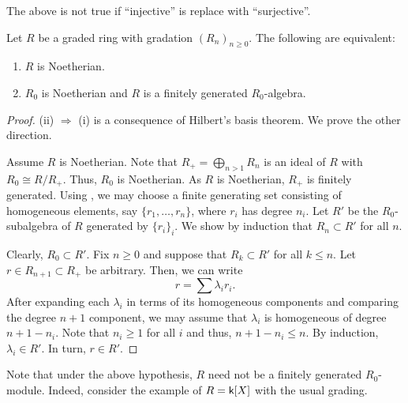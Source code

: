 \begin{rem}
	The above is not true if ``injective'' is replace with ``surjective''.
\end{rem}

\begin{prop} \label{prop:graded-ring-noetherian-equivalent}
	Let $R$ be a graded ring with gradation $(R_{n})_{n \ge 0}$. The following are equivalent:
	\begin{enumerate}[label=(\roman*)]
		\item $R$ is Noetherian.
		\item $R_{0}$ is Noetherian and $R$ is a finitely generated $R_{0}$-algebra.
	\end{enumerate}
\end{prop}
\begin{proof} 
	(ii) $\Rightarrow$ (i) is a consequence of Hilbert's basis theorem. We prove the other direction. 

	Assume $R$ is Noetherian. Note that $R_{+} = \bigoplus_{n > 1} R_{n}$ is an ideal of $R$ with $R_{0} \cong R/R_{+}$. Thus, $R_{0}$ is Noetherian. \newline
	As $R$ is Noetherian, $R_{+}$ is finitely generated. Using , we may choose a finite generating set consisting of homogeneous elements, say $\{r_{1}, \ldots, r_{n}\}$, where $r_{i}$ has degree $n_{i}$. Let $R'$ be the $R_{0}$-subalgebra of $R$ generated by $\{r_{i}\}_{i}$. We show by induction that $R_{n} \subset R'$ for all $n$.

	Clearly, $R_{0} \subset R'$. Fix $n \ge 0$ and suppose that $R_{k} \subset R'$ for all $k \le n$. Let $r \in R_{n + 1} \subset R_{+}$ be arbitrary. Then, we can write
	\begin{equation*} 
		r = \sum \lambda_{i} r_{i}.
	\end{equation*}
	After expanding each $\lambda_{i}$ in terms of its homogeneous components and comparing the degree $n + 1$ component, we may assume that $\lambda_{i}$ is homogeneous of degree $n + 1 - n_{i}$. Note that $n_{i} \ge 1$ for all $i$ and thus, $n + 1 - n_{i} \le n$. By induction, $\lambda_{i} \in R'$. In turn, $r \in R'$.
\end{proof}

\begin{rem}
	Note that under the above hypothesis, $R$ need not be a finitely generated $R_{0}$-module. Indeed, consider the example of $R = \mathsf{k}[X]$ with the usual grading.	
\end{rem}

